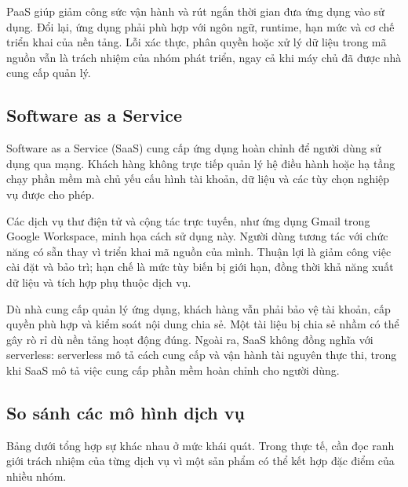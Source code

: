 PaaS giúp giảm công sức vận hành và rút ngắn thời gian đưa ứng dụng vào sử dụng. Đổi lại, ứng dụng phải phù hợp với ngôn ngữ, runtime, hạn mức và cơ chế triển khai của nền tảng. Lỗi xác thực, phân quyền hoặc xử lý dữ liệu trong mã nguồn vẫn là trách nhiệm của nhóm phát triển, ngay cả khi máy chủ đã được nhà cung cấp quản lý.

\subsection{Software as a Service}
Software as a Service (SaaS) cung cấp ứng dụng hoàn chỉnh để người dùng sử dụng qua mạng. Khách hàng không trực tiếp quản lý hệ điều hành hoặc hạ tầng chạy phần mềm mà chủ yếu cấu hình tài khoản, dữ liệu và các tùy chọn nghiệp vụ được cho phép.

Các dịch vụ thư điện tử và cộng tác trực tuyến, như ứng dụng Gmail trong Google Workspace, minh họa cách sử dụng này. Người dùng tương tác với chức năng có sẵn thay vì triển khai mã nguồn của mình. Thuận lợi là giảm công việc cài đặt và bảo trì; hạn chế là mức tùy biến bị giới hạn, đồng thời khả năng xuất dữ liệu và tích hợp phụ thuộc dịch vụ.

Dù nhà cung cấp quản lý ứng dụng, khách hàng vẫn phải bảo vệ tài khoản, cấp quyền phù hợp và kiểm soát nội dung chia sẻ. Một tài liệu bị chia sẻ nhầm có thể gây rò rỉ dù nền tảng hoạt động đúng. Ngoài ra, SaaS không đồng nghĩa với serverless: serverless mô tả cách cung cấp và vận hành tài nguyên thực thi, trong khi SaaS mô tả việc cung cấp phần mềm hoàn chỉnh cho người dùng.

\subsection{So sánh các mô hình dịch vụ}
Bảng dưới tổng hợp sự khác nhau ở mức khái quát. Trong thực tế, cần đọc ranh giới trách nhiệm của từng dịch vụ vì một sản phẩm có thể kết hợp đặc điểm của nhiều nhóm.

